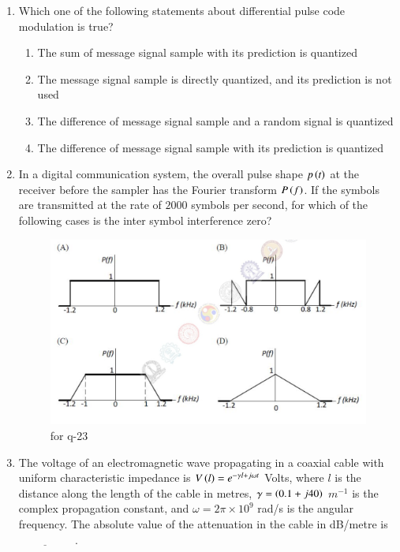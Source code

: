 \documentclass[journal,12pt,onecolumn]{IEEEtran}
\theoremstyle{remark}
\begin{document}
\begin{enumerate}
\hfill {}

\item Which one of the following statements about differential pulse code modulation  is true?
\begin{enumerate}
\item The sum of message signal sample with its prediction is quantized
\item The message signal sample is directly quantized, and its prediction is not used
\item The difference of message signal sample and a random signal is quantized
\item The difference of message signal sample with its prediction is quantized
\end{enumerate}
\hfill {}

\item In a digital communication system, the overall pulse shape $p\left(t\right)$ at the receiver before the sampler has the Fourier transform $P\left(f\right)$. If the symbols are transmitted at the rate of $2000$ symbols per second, for which of the following cases is the inter symbol interference zero?
\begin{figure}[H]
    \centering
    \includegraphics[width=0.8\columnwidth]{figs/8.png}
    \caption{\centering for q-23}
    \label{fig:placeholder_8}
\end{figure}

\hfill {}

\item The voltage of an electromagnetic wave propagating in a coaxial cable with uniform characteristic impedance is $V\left(l\right) = e^{-\gamma l + j\omega t}$ Volts, where $l$ is the distance along the length of the cable in metres, $\gamma = \left(0.1 + j40\right)$ $m^{-1}$ is the complex propagation constant, and $\omega = 2\pi \times 10^9$ rad/s is the angular frequency. The absolute value of the attenuation in the cable in dB/metre is $\underline{\hspace{2cm}}$ . 


\end{enumerate}
\end{document}
